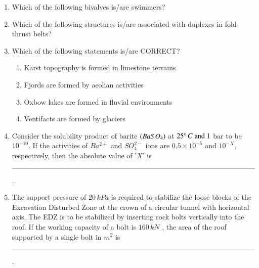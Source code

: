 \documentclass[journal,12pt,onecolumn]{IEEEtran}
\theoremstyle{remark}
\begin{document}
\begin{enumerate}
\item Which of the following bivalves is/are swimmers?
\begin{enumerate}
\end{enumerate}
\hfill{}

\item Which of the following structures is/are associated with duplexes in fold-thrust belts?
\begin{enumerate}
\end{enumerate}
\hfill{}

\item Which of the following statements is/are CORRECT?
\begin{enumerate}
    \item Karst topography is formed in limestone terrains
    \item Fjords are formed by aeolian activities
    \item Oxbow lakes are formed in fluvial environments
    \item Ventifacts are formed by glaciers
\end{enumerate}
\hfill{}

\item Consider the solubility product of barite $\left(BaSO_4\right)$ at $25\degree\,C \text{ and }1$ bar to be $10^{-10}$. If the activities of $Ba^{2+}$ and $SO_4^{2-}$ ions are $0.5 \times 10^{-5}$ and $10^{-X}$, respectively, then the absolute value of '$X$' is \rule{3cm}{0.15mm} .
\hfill{}

\item The support pressure of $20\,kPa$ is required to stabilize the loose blocks of the Excavation Disturbed Zone  at the crown of a circular tunnel with horizontal axis. The EDZ is to be stabilized by inserting rock bolts vertically into the roof. If the working capacity of a bolt is $160\,kN$ , the area of the roof supported by a single bolt in $m^2$ is \rule{3cm}{0.15mm} .
\hfill{}


\end{enumerate}
\end{document}
